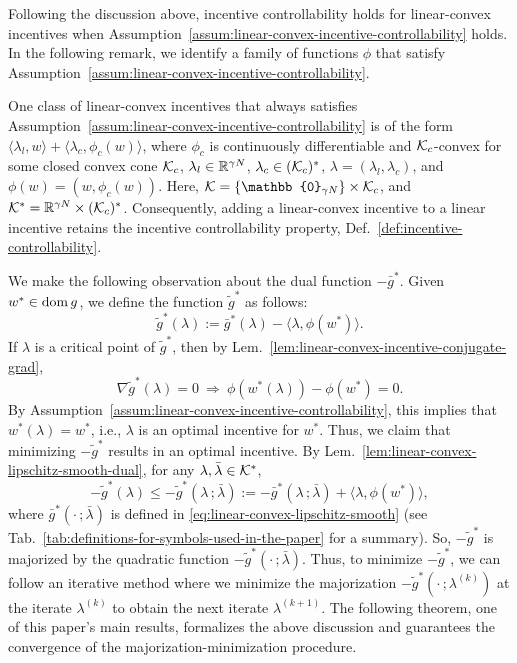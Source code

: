 Following the discussion above, incentive controllability holds for linear-convex incentives when Assumption~\ref{assum:linear-convex-incentive-controllability} holds.
In the following remark, we identify a family of functions $\phi$ that satisfy Assumption~\ref{assum:linear-convex-incentive-controllability}.

\begin{remark}
\label{rem:linear-convex-incentive-controllability}
One class of linear-convex incentives that always satisfies Assumption~\ref{assum:linear-convex-incentive-controllability} is of the form $\langle \lambda_l, w\rangle + \langle \lambda_c, \phi_c(w)\rangle$, where $\phi_c$ is continuously differentiable and $\mathcal{K}_c$-convex for some closed convex cone $\mathcal{K}_c$, $\lambda_l \in \mathbb{R}^{\gamma N}$, $\lambda_c \in (\mathcal{K}_c)^*$, $\lambda = (\lambda_l, \lambda_c)$, and $\phi(w) = (w, \phi_c(w))$.
Here, $\mathset{K} = \{\mathbb{0}_{\Nw\horizon}\} \times \mathset{K}_c$, and $\mathcal{K}^* = \mathbb{R}^{\gamma N} \times (\mathcal{K}_c)^*$.
Consequently, adding a linear-convex incentive to a linear incentive retains the incentive controllability property, Def.~\ref{def:incentive-controllability}.
\end{remark}

We make the following observation about the dual function $-\bar{g}^*$.
Given $w^* \in \operatorname{dom}{g}$, we define the function $\tilde{g}^*$ as follows:
\begin{equation}
\label{eq:linear-convex-dual-transformed}
    \tilde{g}^*(\lambda) := \bar{g}^*(\lambda) - \langle\lambda, \phi(w^*) \rangle.
\end{equation}
If $\lambda$ is a critical point of $\tilde{g}^*$, then by Lem.~\ref{lem:linear-convex-incentive-conjugate-grad},
\begin{equation*}
    \nabla \tilde{g}^*(\lambda) = 0 \ \Rightarrow \ \phi(w^*(\lambda)) - \phi(w^*) = 0.
\end{equation*}
By Assumption~\ref{assum:linear-convex-incentive-controllability}, this implies that $w^*(\lambda) = w^*$, i.e., $\lambda$ is an optimal incentive for $w^*$.
Thus, we claim that minimizing $-\tilde{g}^*$ results in an optimal incentive.
By Lem.~\ref{lem:linear-convex-lipschitz-smooth-dual}, for any $\lambda, \bar{\lambda} \in \mathcal{K}^*$,
\begin{equation}
\label{eq:linear-convex-dual-transformed-lower-bound}
    -\tilde{g}^*(\lambda) \leq -\tilde{g}^*(\lambda \, ; \bar{\lambda}) := -\bar{g}^*(\lambda \, ; \bar{\lambda}) + \langle \lambda, \phi(w^*) \rangle,
\end{equation}
where $\bar{g}^*(\cdot \, ; \bar{\lambda})$ is defined in \eqref{eq:linear-convex-lipschitz-smooth} (see Tab.~\ref{tab:definitions-for-symbols-used-in-the-paper} for a summary).
So, $-\tilde{g}^*$ is majorized by the quadratic function $-\tilde{g}^*(\cdot \, ;\bar{\lambda})$.
Thus, to minimize $-\tilde{g}^*$, we can follow an iterative method where we minimize the majorization $-\tilde{g}^*(\cdot \,; \lambda^{(k)})$ at the iterate $\lambda^{(k)}$ to obtain the next iterate $\lambda^{(k+1)}$.
The following theorem, one of this paper's main results, formalizes the above discussion and guarantees the convergence of the majorization-minimization procedure.


